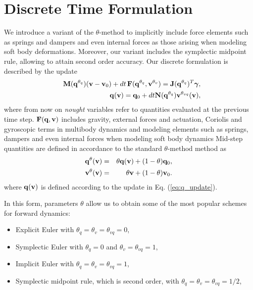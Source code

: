 \section{Discrete Time Formulation}
\label{sec:discrete_formulation}

We introduce a variant of the $\theta\text{-method}$ to implicitly include force
elements such as springs and dampers and even internal forces as those arising
when modeling soft body deformations. Moreover, our variant includes the
symplectic midpoint rule, allowing to attain second order accuracy. Our
discrete formulation is described by the update
\begin{eqnarray}
	&&\mf{M}(\mf{q}^{\theta_{q}})(\mf{v}-\mf{v}_0) + 
	dt\,\mf{F}(\mf{q}^{\theta_{q}}, \mf{v}^{\theta_v}) = \mf{J}(\mf{q}^{\theta_{q}})^T\mf{\bgamma},
	\label{eq:v_update}\\
	&&\mf{q}(\mf{v}) = \mf{q}_0 + dt\mf{N}(\mf{q}^{\theta_{q}})\mf{v}^{\theta_{vq}}(\mf{v}),
	\label{eq:q_update}
\end{eqnarray}
where from now on \textit{nought} variables refer to quantities evaluated at the
previous time step. ${\mathbf{F}}({\mathbf{q}}, {\mathbf{v}})$ includes gravity, external forces
and actuation, Coriolis and gyroscopic terms in multibody dynamics and modeling
elements such as springs, dampers and even internal forces when modeling soft
body dynamics 
Mid-step quantities are defined in accordance to the standard
$\theta\text{-method}$ method as
\begin{eqnarray}
	{\mathbf{q}}^{\theta}({\mathbf{v}}) &=& \theta{\mathbf{q}}({\mathbf{v}}) + (1-\theta){\mathbf{q}}_0,\\
	{\mathbf{v}}^{\theta}({\mathbf{v}}) &=& \theta{\mathbf{v}} + (1-\theta){\mathbf{v}}_0.
\end{eqnarray}
where ${\mathbf{q}}({\mathbf{v}})$ is defined according to the update in Eq.
(\ref{eq:q_update}).

In this form, parameters $\theta$ allow us to obtain some of the most popular
schemes for forward dynamics:
\begin{itemize}
	\item Explicit Euler with $\theta_q=\theta_{v}=\theta_{vq} = 0$,
	\item Symplectic Euler with $\theta_{q} = 0$ and $\theta_v = \theta_{vq}=1$,
	\item Implicit Euler with $\theta_{q} = \theta_v = \theta_{vq}= 1$,
	\item Symplectic midpoint rule, which is second order, with $\theta_{q} =
	\theta_v = \theta_{vq}= 1/2$,
\end{itemize}

